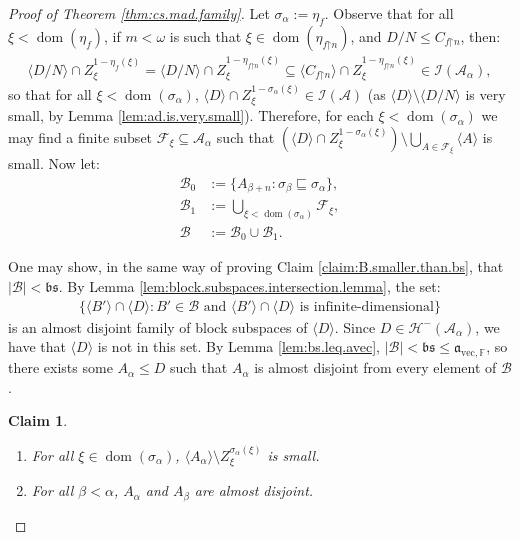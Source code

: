 \documentclass[11pt,reqno]{amsart}
\theoremstyle{plain}
\numberwithin{equation}{section}
\newtheorem{claim}{Claim}
\theoremstyle{definition}
\newcommand{\func}{\operatorname}
\renewcommand{\c}[1]{\langle #1 \rangle}
\newcommand{\bb}[1]{\left( #1 \right)}
\newcommand{\F}{\cal{F}}
\newcommand{\cal}{\mathcal}
\renewcommand{\frak}{\mathfrak}
\newcommand{\dom}{\func{dom}}
\newcommand{\A}{\cal{A}}
\newcommand{\B}{\cal{B}}
\newcommand{\restrictedto}{\mathord{\upharpoonright}}
\renewcommand{\H}{\cal{H}}
\newcommand{\I}{\cal{I}}
\newcommand{\avec}{\frak{a}_{\mathrm{vec},\mathbb{F}}}
\begin{document}
\begin{proof}[Proof of Theorem \ref{thm:cs.mad.family}]
    Let $\sigma_{\alpha} := \eta_f$. Observe that for all $\xi < \dom(\eta_f)$, if $m < \omega$ is such that $\xi \in \dom(\eta_{f\restrictedto n})$, and $D/N \leq C_{f\restrictedto n}$, then:
    \begin{align*}
        \c{D/N} \cap Z_\xi^{1-\eta_f(\xi)} = \c{D/N} \cap Z_\xi^{1-\eta_{f\restrictedto n}(\xi)} \subseteq \c{C_{f\restrictedto n}} \cap Z_\xi^{1-\eta_{f\restrictedto n}(\xi)} \in \I(\A_\alpha),
    \end{align*}
    so that for all $\xi < \dom(\sigma_{\alpha})$, $\c{D} \cap Z_\xi^{1-\sigma_\alpha(\xi)} \in \I(\A)$ (as $\c{D} \setminus \c{D/N}$ is very small, by Lemma \ref{lem:ad.is.very.small}). Therefore, for each $\xi < \dom(\sigma_\alpha)$ we may find a finite subset $\F_\xi \subseteq \A_\alpha$ such that $\bb{\c{D} \cap Z_\xi^{1-\sigma_\alpha(\xi)}} \setminus \bigcup_{A \in \F_\xi} \c{A}$ is small. Now let:
    \begin{align*}
        \B_0 &:= \{A_{\beta+n} : \sigma_\beta \sqsubseteq \sigma_\alpha\}, \\
        \B_1 &:= \bigcup_{\xi < \dom(\sigma_\alpha)} \F_\xi, \\
        \B &:= \B_0 \cup \B_1.
    \end{align*}

    One may show, in the same way of proving Claim \ref{claim:B.smaller.than.bs}, that $|\B| < \frak{bs}$. By Lemma \ref{lem:block.subspaces.intersection.lemma}, the set:
    \begin{align*}
        \{\c{B'} \cap \c{D} : B' \in \B \text{ and } \c{B'} \cap \c{D} \text{ is infinite-dimensional}\}
    \end{align*}
    is an almost disjoint family of block subspaces of $\c{D}$. Since $D \in \H^-(\A_\alpha)$, we have that $\c{D}$ is not in this set. By Lemma \ref{lem:bs.leq.avec}, $|\B| < \frak{bs} \leq \avec$, so there exists some $A_\alpha \leq D$ such that $A_\alpha$ is almost disjoint from every element of $\B$. 

    \begin{claim}
        \hfill
        \begin{enumerate}
            \item For all $\xi \in \dom(\sigma_\alpha)$, $\c{A_\alpha} \setminus Z_\xi^{\sigma_\alpha(\xi)}$ is small.

            \item For all $\beta < \alpha$, $A_\alpha$ and $A_\beta$ are almost disjoint.
        \end{enumerate}
    \end{claim}


\end{proof}
\end{document}
